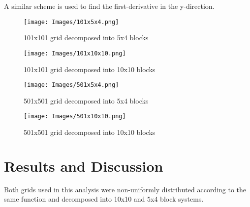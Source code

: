 \documentclass[twocolumn,10pt]{asme2ej}
\begin{document}
\noindent A similar scheme is used to find the first-derivative in the y-direction.



\begin{figure}[htb]
\begin{center}
\texttt{[image: Images/101x5x4.png]}
\caption{101x101 grid decomposed into 5x4 blocks}
\label{101x5x4}
\end{center}
\end{figure}

\begin{figure}[htb]
\begin{center}
\texttt{[image: Images/101x10x10.png]}
\caption{101x101 grid decomposed into 10x10 blocks}
\label{101x10x10}
\end{center}
\end{figure}

\begin{figure}[htb]
\begin{center}
\texttt{[image: Images/501x5x4.png]}
\caption{501x501 grid decomposed into 5x4 blocks}
\label{501x5x4}
\end{center}
\end{figure}

\begin{figure}[htb]
\begin{center}
\texttt{[image: Images/501x10x10.png]}
\caption{501x501 grid decomposed into 10x10 blocks}
\label{501x10x10}
\end{center}
\end{figure}

\section{Results and Discussion}

Both grids used in this analysis were non-uniformly distributed according to the same function and decomposed into 10x10 and 5x4 block systems.
\end{document}
